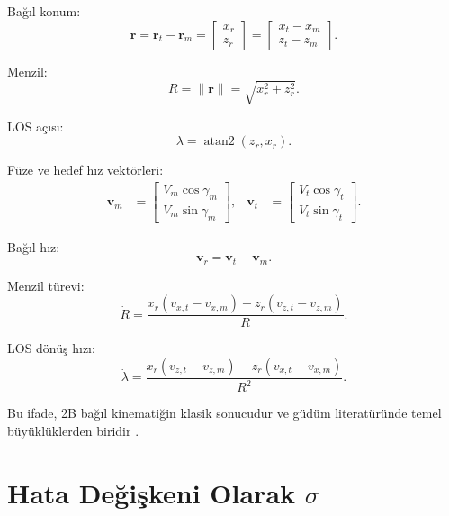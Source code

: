 \documentclass[11pt,a4paper]{article}
\begin{document}
Bağıl konum:
\begin{equation}
\bm{r} = \bm{r}_t - \bm{r}_m
=
\begin{bmatrix}
x_r \\ z_r
\end{bmatrix}
=
\begin{bmatrix}
x_t - x_m \\ z_t - z_m
\end{bmatrix}.
\end{equation}

Menzil:
\begin{equation}
R = \|\bm{r}\| = \sqrt{x_r^2 + z_r^2}.
\label{eq:R}
\end{equation}

LOS açısı:
\begin{equation}
\lambda = \operatorname{atan2}(z_r, x_r).
\label{eq:lambda}
\end{equation}

Füze ve hedef hız vektörleri:
\begin{align}
\bm{v}_m &= \begin{bmatrix}V_m\cos\gamma_m \\ V_m\sin\gamma_m\end{bmatrix},
&
\bm{v}_t &= \begin{bmatrix}V_t\cos\gamma_t \\ V_t\sin\gamma_t\end{bmatrix}.
\end{align}

Bağıl hız:
\begin{equation}
\bm{v}_r = \bm{v}_t - \bm{v}_m.
\end{equation}

Menzil türevi:
\begin{equation}
\dot{R}
=
\frac{x_r(v_{x,t}-v_{x,m}) + z_r(v_{z,t}-v_{z,m})}{R}.
\label{eq:Rdot}
\end{equation}

LOS dönüş hızı:
\begin{equation}
\dot{\lambda}
=
\frac{x_r(v_{z,t}-v_{z,m}) - z_r(v_{x,t}-v_{x,m})}{R^2}.
\label{eq:lambdadot}
\end{equation}

Bu ifade, 2B bağıl kinematiğin klasik sonucudur ve güdüm literatüründe temel büyüklüklerden biridir \cite{palumbo2010principles,li1999aopn}.

\section{Hata Değişkeni Olarak \texorpdfstring{\(\sigma\)}{sigma}}
\end{document}
